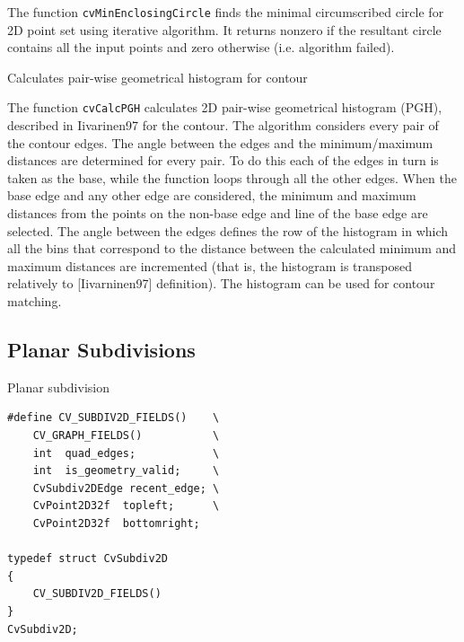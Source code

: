 The function \texttt{cvMinEnclosingCircle} finds the minimal circumscribed
circle for 2D point set using iterative algorithm. It returns nonzero
if the resultant circle contains all the input points and zero otherwise
(i.e. algorithm failed).

\label{CalcPGH}

Calculates pair-wise geometrical histogram for contour


\begin{description}
\end{description}

The function \texttt{cvCalcPGH} calculates
2D pair-wise geometrical histogram (PGH), described in
Iivarinen97
for the contour. The algorithm considers every pair of the contour
edges. The angle between the edges and the minimum/maximum distances
are determined for every pair. To do this each of the edges in turn
is taken as the base, while the function loops through all the other
edges. When the base edge and any other edge are considered, the minimum
and maximum distances from the points on the non-base edge and line of
the base edge are selected. The angle between the edges defines the row
of the histogram in which all the bins that correspond to the distance
between the calculated minimum and maximum distances are incremented
(that is, the histogram is transposed relatively to [Iivarninen97]
definition). The histogram can be used for contour matching.

\subsection{Planar Subdivisions}

\label{CvSubdiv2D}

Planar subdivision

\begin{lstlisting}
#define CV_SUBDIV2D_FIELDS()    \
    CV_GRAPH_FIELDS()           \
    int  quad_edges;            \
    int  is_geometry_valid;     \
    CvSubdiv2DEdge recent_edge; \
    CvPoint2D32f  topleft;      \
    CvPoint2D32f  bottomright;

typedef struct CvSubdiv2D
{
    CV_SUBDIV2D_FIELDS()
}
CvSubdiv2D;
\end{lstlisting}

